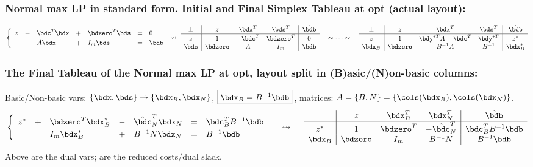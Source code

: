 \documentclass[a4paper]{article}
\begin{document}
\subsubsection*{Normal max LP in standard form. Initial and Final Simplex Tableau at opt (actual layout):}%
\[
  \begin{cases}
    \begin{array}[m]{*{5}{lc}}
    z &-& \bdc^T\bdx &+& \bdzero^T\bds &=&  0   \cr
      & &   A\bdx    &+&   I_m\bds     &=& \bdb \cr
    \end{array}
  \end{cases}
  \mkern-16mu\rightsquigarrow\;
    \begin{array}[m]{c|ccc|c}
 \perp &     z   & \bdx^T & \bds^T     & \hat\bdb \cr\hline\rule{0pt}{10pt}
    z  &     1   &-\bdc^T & \bdzero^T  &   0    \cr %
 \bds  & \bdzero & A      & I_m        & \bdb   \cr
    \end{array}
  \quad\sim\cdots\sim\quad
    \begin{array}[m]{c|ccc|c}
 \perp &     z   &     \bdx^T &     \bds^T   & \hat\bdb \cr\hline\rule{0pt}{10pt}
 z & 1 & \bdy^{*T}A-\bdc^T &     \bdy^{*T} & z^*\cr %
 \bdx_B& \bdzero &     B^{-1}A&     B^{-1}   & \bdx_B^*   \cr
    \end{array}
\]

\subsubsection*{The Final Tableau of the Normal max LP at opt, layout split in (B)asic/(N)on-basic columns:}%
Basic/Non-basic vars:
$\{\bdx,\bds\}\to\{\bdx_B,\bdx_N\}$,
$\boxed{\bdx_B=B^{-1}\bdb}$\,,
matrices:
 $A=\{B,N\}=\{\cols(\bdx_B),\cols(\bdx_N)\}$.
\[
  \begin{cases}
    \begin{array}[m]{*{5}{lc}}
      z^* &+& \bdzero^T\bdx_B^* &-& \hat\bdc_N^T\bdx_N &=&  \bdc_B^TB^{-1}\bdb \cr
      & &    I_m\bdx_B^*  &+& B^{-1}N\bdx_N     &=& B^{-1}\bdb \cr
    \end{array}
  \end{cases}
  \;\rightsquigarrow\quad\;
    \begin{array}[m]{c|ccc|c}
   \perp &     z   & \bdx_B^T  & \bdx_N^T & \hat\bdb \cr\hline\rule{0pt}{10pt}
      z^*&     1   & \bdzero^T &-\hat\bdc_N^T & \bdc_B^TB^{-1}\bdb \cr %
  \bdx_B & \bdzero &  I_m  & B^{-1}N      &  B^{-1}\bdb   \cr
    \end{array}
\]
Above  are the dual vars;
 are the reduced costs/dual slack.
\end{document}
